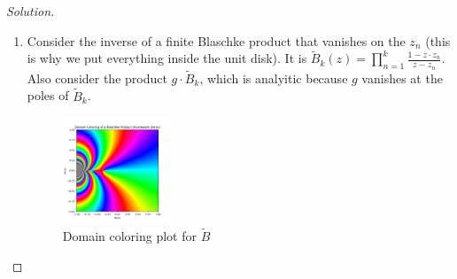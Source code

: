 \begin{proof}[Solution]
\begin{enumerate}[label=\textbf{Step \arabic*}]
\begin{claim}\leavevmode
\begin{align*}
			\prod_{n\geq 0}\left|  -1+\frac{1}{n+\frac{1}{2}}\right|=0.
				\end{align*}
\end{claim}			
\begin{proof}\leavevmode
By taking exponent of the partial sums of the following series, we see it's enough to show that
\begin{equation}\label{eq:log}\sum_{n \geq 0}\operatorname{log}\left|  -1+\frac{1}{n+\frac{1}{2}}\right|=-\infty.
\end{equation}
To show this first notice that $\left|  -1+\frac{1}{n+1/2}\right|$ is just  $1-\frac{1}{n+1/2}$. We can also quickly notice that $\operatorname{log}\left(1-\frac{1}{n+1/2}\right)$ is a sequence of negative numbers convering to 0.

(It was not immediate to me why the this series should diverge or converge. The following argument was provided by ChatGPT.)

We can prove the series diverges if we find a divergent series that bounds it from above. Such series is $\sum\frac{-1}{n+1/2}$. Indeed, it turns out that for every number $0\leq x<1$,
\[\operatorname{log}(1-x) \leq -x.\]
To see why, define the function $f(x)=\operatorname{log}(1-x)+x$ and differentiate to find
\[\frac{d}{dx}\operatorname{log}(1-x)+x=-\frac{1}{1-x}+1=\frac{1}{1-x}+\frac{1-x}{1-x}=\frac{-x}{1-x}\leq 0,\]
and since also $f(0)=0$, we have that
\[\operatorname{log}(1-x)+x\leq 0,\qquad 0\leq x<1.\]
Finally just recall that $\sum_{n\geq 0}\frac{1}{n}$ diverges (and behaves like $\sum \frac{1}{n+1/2}$ for lage $n$). This confirms \cref{eq:log}.




\end{proof}
\clearpage
		\item Consider the inverse of a finite Blaschke product that vanishes on the $z_{n}$ (this is why we put everything inside the unit disk). It is $\tilde{B}_{k}(z)=\prod_{n=1}^{k} \frac{1-z\cdot z_{n}}{z-z_{n}}  $. Also consider the product $g\cdot \tilde{B}_{k}$, which is analyitic because $g$ vanishes at the poles of $\tilde{B}_{k}$.
\begin{figure}[H]
	\centering
	\includegraphics[width=0.3\textwidth]{Figure_1.png}
	\caption{Domain coloring plot for $\tilde{B}$}
\end{figure}


\end{enumerate}
\end{proof}
